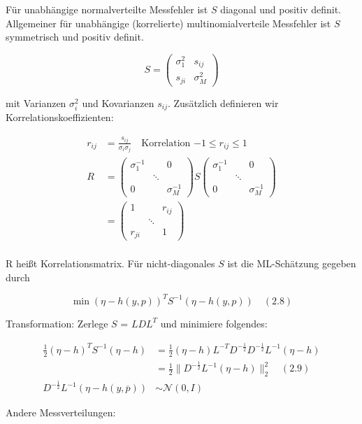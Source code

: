 Für unabhängige normalverteilte Messfehler ist $S$ diagonal und positiv definit. Allgemeiner für unabhängige (korrelierte) multinomialverteile Messfehler ist $S$ symmetrisch und positiv definit.

\[ S=\begin{pmatrix} \sigma_1^2 & s_{ij} \\ s_{ji} & \sigma_M^2 \end{pmatrix} \]

mit Varianzen $\sigma_i^2$ und Kovarianzen $s_{ij}$. Zusätzlich definieren wir Korrelationskoeffizienten:

\begin{align*}
r_{ij} &= \frac{s_{ij}}{\sigma_i\sigma_j} \quad \text{Korrelation $-1 \leq r_{ij} \leq 1$} \\
R &= \begin{pmatrix} \sigma_1^{-1} & & 0 \\ & \ddots & \\ 0 & & \sigma_M^{-1} \end{pmatrix} S \begin{pmatrix} \sigma_1^{-1} & & 0 \\ & \ddots & \\ 0 & & \sigma_M^{-1} \end{pmatrix} \\
&= \begin{pmatrix} 1 & & r_{ij} \\ & \ddots & \\ r_{ji} & & 1 \end{pmatrix} \\
\end{align*}

R heißt Korrelationsmatrix. Für nicht-diagonales $S$ ist die ML-Schätzung gegeben durch

\[ \min (\eta-h(y,p))^T S^{-1} (\eta-h(y,p)) \quad (2.8)\]

Transformation: Zerlege $S$ = $LDL^T$ und minimiere folgendes:

\begin{align*}
\frac 12 (\eta -h)^T S^{-1} (\eta-h) &= \frac 12 (\eta-h)L^{-T} D^{-\frac 12} D^{-\frac 12} L^{-1} (\eta-h) \\
&= \frac 12 \|D^{-\frac 12} L^{-1}(\eta -h)\|_2^2 \quad (2.9) \\
D^{-\frac 12} L^{-1} (\eta -h(y,\overline p)) &\sim \mathcal N(0,I)
\end{align*}

Andere Messverteilungen:

